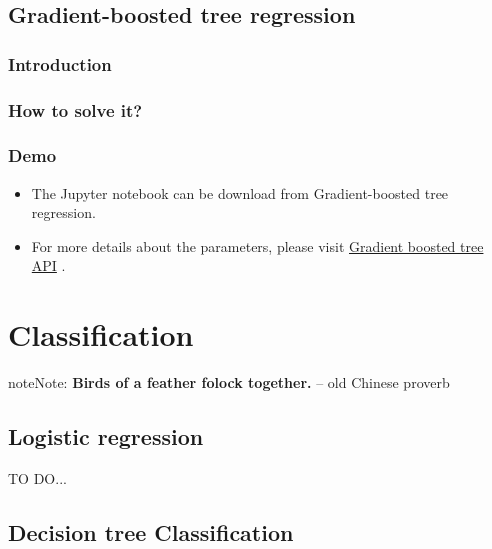 \documentclass[letterpaper,11pt,english]{sphinxmanual}
\begin{document}
\section{Gradient-boosted tree regression}
\label{regression:gradient-boosted-tree-regression}

\subsection{Introduction}
\label{regression:id15}

\subsection{How to solve it?}
\label{regression:id16}

\subsection{Demo}
\label{regression:id17}\begin{itemize}
\item {} 
The Jupyter notebook can be download from Gradient-boosted tree regression.

\item {} 
For more details about the parameters, please visit \href{http://takwatanabe.me/pyspark/generated/generated/ml.regression.GBTRegressor.html}{Gradient boosted tree API} .

\end{itemize}


\chapter{Classification}
\label{classification:gradient-boosted-tree-api}\label{classification::doc}\label{classification:classification}\label{classification:id1}
\begin{notice}{note}{Note:}
\textbf{Birds of a feather folock together.} -- old Chinese proverb
\end{notice}


\section{Logistic regression}
\label{classification:logistic-regression}
TO DO...


\section{Decision tree Classification}
\label{classification:decision-tree-classification}
\end{document}
